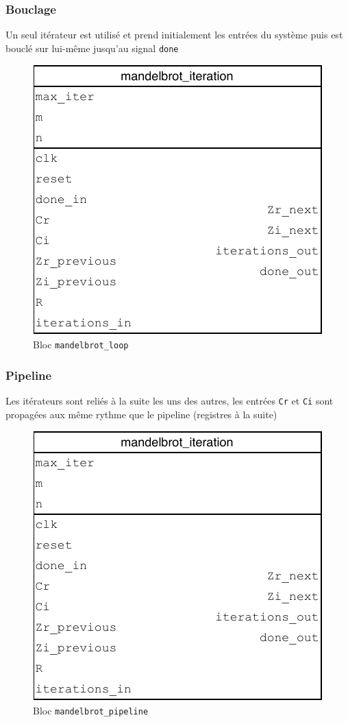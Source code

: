 \documentclass[LPSC_Labo03_SDeriaz]{subfiles}
\begin{document}
\subsubsection{Bouclage}
Un seul itérateur est utilisé et prend initialement les entrées du système puis est bouclé sur lui-même jusqu'au signal \verb!done!
\begin{figure}[H]
\centering
\includegraphics[scale=0.75,page=2]{../Documents/Schemas-crop.pdf}
\caption[caption]{Bloc \texttt{mandelbrot\_loop}}
\end{figure}
\subsubsection{Pipeline}
Les itérateurs sont reliés à la suite les uns des autres, les entrées \verb!Cr! et \verb!Ci! sont propagées aux même rythme que le pipeline (registres à la suite)
\begin{figure}[H]
\centering
\includegraphics[width=\textwidth,page=3]{../Documents/Schemas-crop.pdf}
\caption[caption]{Bloc \texttt{mandelbrot\_pipeline}}
\end{figure}
\end{document}
